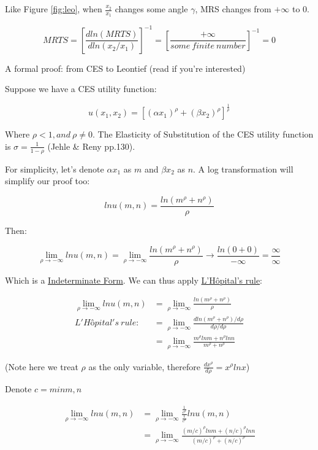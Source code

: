 \documentclass{article}
\begin{document}
\vspace{3mm}

Like Figure \ref{fig:leo}, when $\frac{x_2}{x_1}$ changes some angle $\gamma$, MRS changes from $+\infty$ to $0$.

$$MRTS = [\frac{d ln(MRTS)}{d ln(x_2/x_1)}]^{-1} =  [\frac{+\infty}{some \ finite \ number }]^{-1} = 0$$

\begin{mdframed}[backgroundcolor=blue!20,linecolor=white]
A formal proof: from CES to Leontief (read if you're interested)

\vspace{2mm}

Suppose we have a CES utility function:

$$u(x_1,x_2) = [(\alpha x_1)^\rho + (\beta x_2)^\rho]^\frac{1}{\rho}$$

Where $\rho < 1, and \ \rho \ne 0$. The Elasticity of Substitution of the CES utility function is $\sigma = \frac{1}{1-\rho}$ (Jehle \& Reny pp.130).


For simplicity, let's denote $\alpha x_1$ as $m$ and $\beta x_2$ as $n$. A log transformation will simplify our proof too:

$$ln u(m,n) = \frac{ln(m^\rho + n^\rho)}{\rho}$$

Then:

$$\lim_{\rho \to -\infty} ln u(m,n) = \lim_{\rho \to -\infty}\frac{ln(m^\rho + n^\rho)}{\rho} \to \frac{ln(0+0)}{-\infty} = \frac{\infty}{\infty}$$

Which is a \href{https://en.wikipedia.org/wiki/Indeterminate_form}{Indeterminate Form}. We can thus apply \href{https://en.wikipedia.org/wiki/L\%27H\%C3\%B4pital\%27s_rule}{L'Hôpital's rule}:

\begin{align*}
\lim_{\rho \to -\infty} ln u(m,n) &= \lim_{\rho \to -\infty}\frac{ln(m^\rho + n^\rho)}{\rho} \\
L'Hôpital's \ rule : \ \ \  &= \lim_{\rho \to -\infty} \frac{d ln(m^\rho + n^\rho) /d \rho}{d \rho / d\rho} \\
&= \lim_{\rho \to -\infty} \frac{m^\rho ln m+ n^\rho ln n}{m^\rho + n^\rho}
\end{align*}

(Note here we treat $\rho$ as the only variable, therefore $\frac{d x^\rho}{d\rho}=x^\rho lnx$)

Denote $c = min{m,n}$

\begin{align*}
\lim_{\rho \to -\infty} ln u(m,n) &=  \lim_{\rho \to -\infty} \frac{\frac{1}{c^\rho}}{\frac{1}{c^\rho}} ln u(m,n)\\
&= \lim_{\rho \to -\infty} \frac{(m/c)^\rho ln m+ (n/c)^\rho ln n}{(m/c)^\rho + (n/c)^\rho}
\end{align*}


\end{mdframed}
\end{document}

